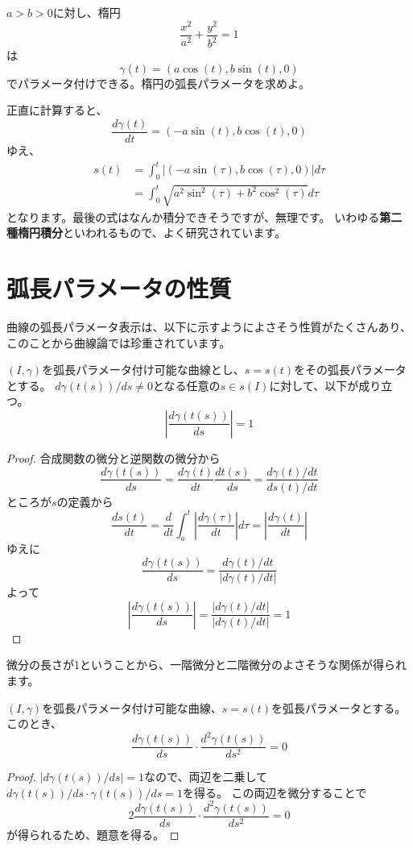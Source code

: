 \begin{example}
  $a>b>0$に対し、楕円
  \[
    \frac{x^2}{a^2}+\frac{y^2}{b^2}=1
  \]
  は
  \[
    \gamma(t)=(a\cos(t),b\sin(t),0)
  \]
  でパラメータ付けできる。楕円の弧長パラメータを求めよ。
\end{example}
正直に計算すると、
\[
  \frac{d\gamma(t)}{dt}=(-a\sin(t),b\cos(t),0)
\]
ゆえ、
\begin{align*}
  s(t)&=\int_0^t\left|(-a\sin(\tau),b\cos(\tau),0)\right|d\tau\\
  &=\int_0^t\sqrt{a^2\sin^2(\tau)+b^2\cos^2(\tau)}d\tau
\end{align*}
となります。最後の式はなんか積分できそうですが、無理です。
いわゆる\textbf{第二種楕円積分}といわれるもので、よく研究されています。



\section{弧長パラメータの性質}

曲線の弧長パラメータ表示は、以下に示すようによさそう性質がたくさんあり、このことから曲線論では珍重されています。

\begin{theorem}
  $(I,\gamma)$を弧長パラメータ付け可能な曲線とし、$s=s(t)$をその弧長パラメータとする。
  $d\gamma(t(s))/ds\neq0$となる任意の$s\in s(I)$に対して、以下が成り立つ。
  \[
    \left|\frac{d\gamma(t(s))}{ds}\right|=1
  \]
\end{theorem}
\begin{proof}
  合成関数の微分と逆関数の微分から
  \[
    \frac{d\gamma(t(s))}{ds}=\frac{d\gamma(t)}{dt}\frac{dt(s)}{ds}=\frac{d\gamma(t)/dt}{ds(t)/dt}
  \]
  ところが$s$の定義から
  \[
    \frac{ds(t)}{dt}=\frac{d}{dt}\int_a^t\left|\frac{d\gamma(\tau)}{dt}\right|d\tau=\left|\frac{d\gamma(t)}{dt}\right|
  \]
  ゆえに
  \[
    \frac{d\gamma(t(s))}{ds}=\frac{d\gamma(t)/dt}{|d\gamma(t)/dt|}
  \]
  よって
  \[
    \left|\frac{d\gamma(t(s))}{ds}\right|=\frac{|d\gamma(t)/dt|}{|d\gamma(t)/dt|}=1
  \]
\end{proof}

微分の長さが1ということから、一階微分と二階微分のよさそうな関係が得られます。
\begin{theorem}
  $(I,\gamma)$を弧長パラメータ付け可能な曲線、$s=s(t)$を弧長パラメータとする。
  このとき、
  \[
    \frac{d\gamma(t(s))}{ds}\cdot\frac{d^2\gamma(t(s))}{ds^2}=0
  \]
\end{theorem}
\begin{proof}
  $|d\gamma(t(s))/ds|=1$なので、両辺を二乗して$d\gamma(t(s))/ds\cdot\gamma(t(s))/ds=1$を得る。
  この両辺を微分することで
  \[
    2\frac{d\gamma(t(s))}{ds}\cdot\frac{d^2\gamma(t(s))}{ds^2}=0
  \]
  が得られるため、題意を得る。
\end{proof}

